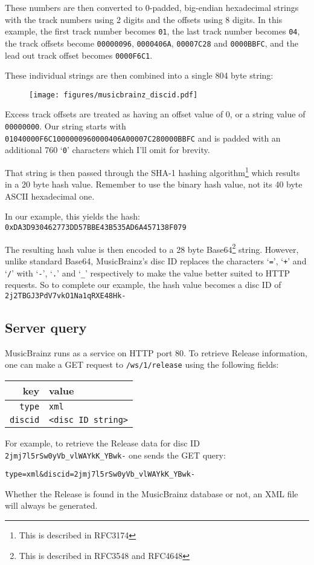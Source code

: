 These numbers are then converted to 0-padded, big-endian hexadecimal strings
with the track numbers using 2 digits and the offsets using 8 digits.
In this example, the first track number becomes \texttt{01},
the last track number becomes \texttt{04},
the track offsets become \texttt{00000096}, \texttt{0000406A},
\texttt{00007C28} and \texttt{0000BBFC},
and the lead out track offset becomes \texttt{0000F6C1}.

These individual strings are then combined into a single 804 byte string:
\begin{figure}[h]
\texttt{[image: figures/musicbrainz\_discid.pdf]}
\end{figure}

Excess track offsets are treated as having an offset value of 0,
or a string value of \texttt{00000000}.
Our string starts with \texttt{01040000F6C1000000960000406A00007C280000BBFC}
and is padded with an additional 760 `\texttt{0}' characters
which I'll omit for brevity.

That string is then passed through the SHA-1 hashing algorithm\footnote{This is described in RFC3174}
which results in a 20 byte hash value.
Remember to use the binary hash value, not its 40 byte ASCII hexadecimal one.

In our example, this yields the hash:
\texttt{0xDA3D930462773DD57BBE43B535AD6A457138F079}

The resulting hash value is then encoded to a 28 byte Base64\footnote{This is described in RFC3548 and RFC4648} string.
However, unlike standard Base64, MusicBrainz's disc ID replaces the
characters `\texttt{=}', `\texttt{+}' and `\texttt{/}' with `\texttt{-}', `\texttt{.}' and `\texttt{\_}' respectively to
make the value better suited to HTTP requests.
So to complete our example, the hash value becomes a disc ID of
\texttt{2j2TBGJ3PdV7vkO1Na1qRXE48Hk-}

\pagebreak

\subsection{Server query}
MusicBrainz runs as a service on HTTP port 80.
To retrieve Release information, one can make a GET request to
\texttt{/ws/1/release} using the following fields:
\begin{table}[h]
\begin{tabular}{|r|l|}
\hline
key & value \\
\hline
\texttt{type} & \texttt{xml} \\
\texttt{discid} & \texttt{<disc ID string>} \\
\hline
\end{tabular}
\end{table}
\par
\noindent
For example, to retrieve the Release data for disc ID
\texttt{2jmj7l5rSw0yVb\_vlWAYkK\_YBwk-} one sends the GET query:
\begin{Verbatim}[frame=single]
type=xml&discid=2jmj7l5rSw0yVb_vlWAYkK_YBwk-
\end{Verbatim}
Whether the Release is found in the MusicBrainz database or not,
an XML file will always be generated.

